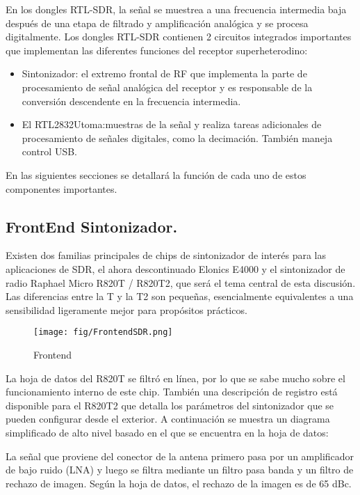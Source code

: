 En los dongles RTL-SDR, la señal se muestrea a una frecuencia intermedia baja después de una etapa de filtrado y amplificación analógica y se procesa digitalmente. Los dongles RTL-SDR contienen 2 circuitos integrados importantes que implementan las diferentes funciones del receptor superheterodino:
\begin{itemize}
    \item Sintonizador: el extremo frontal de RF que implementa la parte de procesamiento de señal analógica del receptor y es responsable de la conversión descendente en la frecuencia intermedia.
    \item El RTL2832Utoma:muestras de la señal y realiza tareas adicionales de procesamiento de señales digitales, como la decimación. También maneja control USB. 
\end{itemize}

En las siguientes secciones se detallará la función de cada uno de estos componentes importantes. 



\subsection{FrontEnd Sintonizador.}

Existen dos familias principales de chips de sintonizador de interés para las aplicaciones de SDR, el ahora descontinuado Elonics E4000 y el sintonizador de radio Raphael Micro R820T / R820T2, que será el tema central de esta discusión. Las diferencias entre la T y la T2 son pequeñas, esencialmente equivalentes a una sensibilidad ligeramente mejor para propósitos prácticos.


\begin{figure}[h!]
\centering
\texttt{[image: fig/FrontendSDR.png]}
\caption{Frontend}
\label{fig:frontend}
\end{figure}

La hoja de datos del R820T se filtró en línea, por lo que se sabe mucho sobre el funcionamiento interno de este chip. También una descripción de registro está disponible para el R820T2 que detalla los parámetros del sintonizador que se pueden configurar desde el exterior. A continuación se muestra un diagrama simplificado de alto nivel basado en el que se encuentra en la hoja de datos:

La señal que proviene del conector de la antena primero pasa por un amplificador de bajo ruido (LNA) y luego se filtra mediante un filtro pasa banda y un filtro de rechazo de imagen. 
Según la hoja de datos, el rechazo de la imagen es de 65 dBc.


